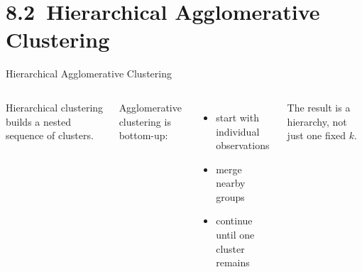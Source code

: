 \documentclass[aspectratio=169]{beamer}
\begin{document}

\section{8.2~Hierarchical Agglomerative Clustering}

\begin{frame}{Hierarchical Agglomerative Clustering}
\begin{columns}[T,onlytextwidth]


Hierarchical clustering builds a nested sequence of clusters.

\vspace{0.5em}

Agglomerative clustering is bottom-up:
\begin{itemize}
\item start with individual observations
\item merge nearby groups
\item continue until one cluster remains
\end{itemize}

\vspace{0.5em}

The result is a hierarchy, not just one fixed \(k\).


\end{columns}
\end{frame}
\end{document}

